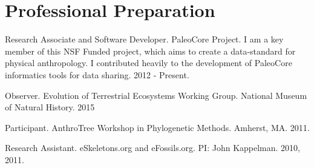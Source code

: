 \documentclass{article}
\begin{document}
\section*{Professional Preparation}
\begin{description*}

\item[] Research Associate and Software Developer. PaleoCore Project. I am a key member of this NSF Funded project, which aims to create a data-standard for physical anthropology. I contributed heavily to the development of PaleoCore informatics tools for data sharing. 2012 - Present.

\item[] Observer. Evolution of Terrestrial Ecosystems Working Group. National Museum of Natural History. 2015

\item[] Participant. AnthroTree Workshop in Phylogenetic Methods. Amherst, MA. 2011.

\item[] Research Assistant. eSkeletons.org and eFossils.org. PI: John Kappelman. 2010, 2011.

\end{description*}
\end{document}
